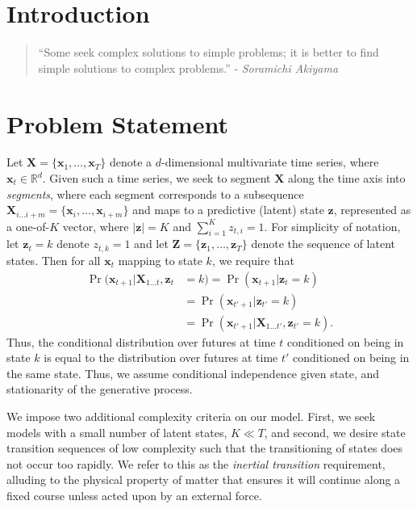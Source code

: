 \documentclass[letterpaper]{article}
\newenvironment{dedication}
        {\vspace{0.0ex}\begin{quotation}\begin{center}\begin{em}}
        {\par\end{em}\end{center}\end{quotation}}
\begin{document}
\section{Introduction}
\begin{dedication} ``Some seek complex solutions to simple problems; it is better to find simple solutions to complex problems.'' - \emph{Soramichi Akiyama}
\end{dedication}



\section{Problem Statement}

Let $\mathbf{X} = \{\mathbf{x}_1, \ldots, \mathbf{x}_T\}$ denote a $d$-dimensional multivariate time series, where $\mathbf{x}_t \in \mathbb{R}^d$. Given such a time series, we seek to segment $\mathbf{X}$ along the time axis into \emph{segments}, where each segment corresponds to a subsequence $\mathbf{X}_{i\ldots i+m} = \{\mathbf{x}_i, \ldots, \mathbf{x}_{i+m}\}$ and maps to a predictive (latent) state $\mathbf{z}$, represented as a one-of-$K$ vector, where $|\mathbf{z}| = K$ and $\sum_{i=1}^{K}z_{t,i} = 1$. For simplicity of notation, let $\mathbf{z}_{t} = k$ denote $z_{t,k} = 1$ and let $\mathbf{Z} = \{\mathbf{z}_1, \ldots, \mathbf{z}_T\}$ denote the sequence of latent states. Then for all $\mathbf{x}_{t}$ mapping to state $k$, we require that
\begin{align*}
    \Pr(\mathbf{x}_{t+1}|\mathbf{X}_{1\ldots t}, \mathbf{z}_t &= k) = \Pr(\mathbf{x}_{t+1}| \mathbf{z}_t = k) \\
                                                            &= \Pr(\mathbf{x}_{t'+1}| \mathbf{z}_{t'} = k) \\
                                                            &= \Pr(\mathbf{x}_{t'+1}| \mathbf{X}_{1\ldots t'}, \mathbf{z}_{t'} = k).
\end{align*}
Thus, the conditional distribution over futures at time $t$ conditioned on being in state $k$ is equal to the distribution over futures at time $t'$ conditioned on being in the same state. Thus, we assume conditional independence given state, and stationarity of the generative process.

We impose two additional complexity criteria on our model. First, we seek models with a small number of latent states, $K \ll T$, and second, we desire state transition sequences of low complexity such that the transitioning of states does not occur too rapidly. We refer to this as the \emph{inertial transition} requirement, alluding to the physical property of matter that ensures it will continue along a fixed course unless acted upon by an external force. 
\end{document}

